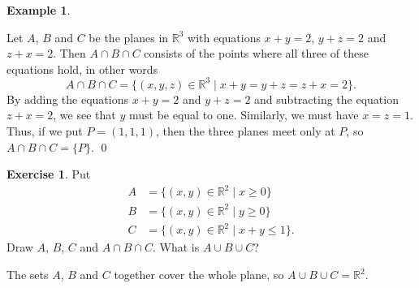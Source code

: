\documentclass[a4paper]{book}
\newcommand{\R}         {{\mathbb{R}}}
\newcommand{\st}        {\;|\;}
\renewcommand{\:}{\colon}
\newcommand{\bilabel}[1]{\hypertarget{#1}{\label{#1}}}
\theoremstyle{definition}
\newtheorem{example}[theorem]{Example}
\newtheorem{exercise}[theorem]{Exercise}
\renewenvironment{solution}{\SolutionInline}{\endSolutionInline}
\begin{document}
\begin{example}\bilabel{eg-intersect-planes}
 Let $A$, $B$ and $C$ be the planes in $\R^3$ with equations $x+y=2$,
 $y+z=2$ and $z+x=2$.  Then $A\cap B\cap C$ consists of the points
 where all three of these equations hold, in other words
 \[ A\cap B\cap C = \{(x,y,z)\in\R^3 \st x+y=y+z=z+x=2\}. \]
 By adding the equations $x+y=2$ and $y+z=2$ and subtracting the
 equation $z+x=2$, we see that $y$ must be equal to one.  Similarly,
 we must have $x=z=1$.  Thus, if we put $P=(1,1,1)$, then the three
 planes meet only at $P$, so $A\cap B\cap C=\{P\}$. \qed
\end{example}

\begin{exercise}
 Put
 \begin{align*}
  A &= \{(x,y)\in\R^2 \st x\geq 0\} \\
  B &= \{(x,y)\in\R^2 \st y\geq 0\} \\
  C &= \{(x,y)\in\R^2 \st x+y\leq 1\}.
 \end{align*}
 Draw $A$, $B$, $C$ and $A\cap B\cap C$.  What is
 $A\cup B\cup C$?
\end{exercise}
\begin{solution}
 \par\noindent %
 \begin{center}
  \hspace{2em}
  \hspace{2em}
  \hspace{2em}
 \end{center}
 The sets $A$, $B$ and $C$ together cover the whole plane, so
 $A\cup B\cup C=\R^2$.
\end{solution}
\end{document}
